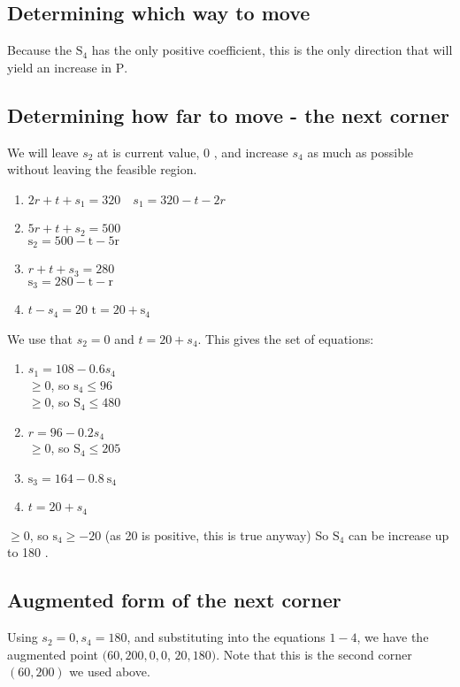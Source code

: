 \subsection{Determining which way to move}
Because the $\mathrm{S}_{4}$ has the only positive coefficient, this is the only direction that will yield an increase in $\mathrm{P}$.

\subsection{Determining how far to move - the next corner}
We will leave $s_{2}$ at is current value, 0 , and increase $s_{4}$ as much as possible without leaving the feasible region.

\begin{enumerate}
  \item $2 r+t+s_{1}=320 \quad s_{1}=320-t-2 r$
  \item $5 r+t+s_{2}=500$\\
$\mathrm{s}_{2}=500-\mathrm{t}-5 \mathrm{r}$
  \item $r+t+s_{3}=280$\\
$\mathrm{s}_{3}=280-\mathrm{t}-\mathrm{r}$
  \item $t-s_{4}=20$ $\mathrm{t}=20+\mathrm{s}_{4}$
\end{enumerate}
We use that $s_{2}=0$ and $t=20+s_{4}$. This gives the set of equations:

\begin{enumerate}
  \item $s_{1}=108-0.6 s_{4}$\\
$\geq 0$, so $\mathrm{s}_{4} \leq 96$\\
$\geq 0$, so $\mathrm{S}_{4} \leq 480$

  \item $r=96-0.2 s_{4}$\\
$\geq 0$, so $\mathrm{S}_{4} \leq 205$

  \item $\mathrm{s}_{3}=164-0.8 \mathrm{~s}_{4}$

  \item $t=20+s_{4}$

\end{enumerate}
$\geq 0$, so $\mathrm{s}_{4} \geq-20$ (as 20 is positive, this is true anyway) So $\mathrm{S}_{4}$ can be increase up to 180 .

\subsection{Augmented form of the next corner}
Using $s_{2}=0, s_{4}=180$, and substituting into the equations $1-4$, we have the augmented point $(60,200,0,0$, $20,180)$. Note that this is the second corner $(60,200)$ we used above.

